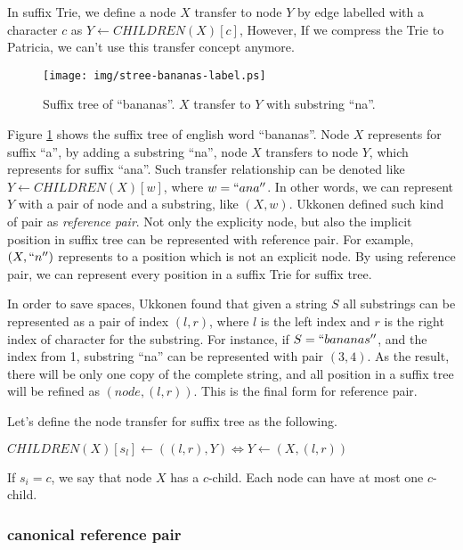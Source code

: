 \documentclass{article}
\begin{document}
In suffix Trie, we define a node $X$ transfer to node $Y$ by edge labelled with
a character $c$ as $Y \leftarrow CHILDREN(X)[c]$, However, If we compress the Trie
to Patricia, we can't use this transfer concept anymore.

\begin{figure}[htbp]
   \begin{center}
     \texttt{[image: img/stree-bananas-label.ps]}
     \caption{Suffix tree of ``bananas''. $X$ transfer to $Y$ with substring ``na''.}
     \label{fig:stree-bananas-label}
   \end{center}
\end{figure}

Figure \ref{fig:stree-bananas-label} shows the suffix tree of english word ``bananas''.
Node $X$ represents for suffix ``a'', by adding a substring ``na'', node $X$ transfers
to node $Y$, which represents for suffix ``ana''. Such transfer relationship can be
denoted like $Y \leftarrow CHILDREN(X)[w]$, where $w=``ana''$. In other words, we can
represent $Y$ with a pair of node and a substring, like $(X, w)$. Ukkonen defined
such kind of pair as {\em reference pair}. Not only the explicity node, but also the
implicit position in suffix tree can be represented with reference pair. For example,
$(X, ``n'')$ represents to a position which is not an explicit node. By using reference
pair, we can represent every position in a suffix Trie for suffix tree.

In order to save spaces, Ukkonen found that given a string $S$ all substrings can
be represented as a pair of index $(l, r)$, where $l$ is the left index and $r$ is the 
right index of character for the substring. For instance, if $S=``bananas''$, and the
index from 1, substring ``na'' can be represented with pair $(3, 4)$. As the result,
there will be only one copy of the complete string, and all position in a suffix tree
will be refined as $(node, (l, r))$. This is the final form for reference pair.

Let's define the node transfer for suffix tree as the following.

$CHILDREN(X)[s_l] \leftarrow ((l, r), Y) \iff Y \leftarrow (X, (l, r))$

If $s_i=c$, we say that node $X$ has a $c$-child. Each node can have at most one $c$-child.

\subsubsection{canonical reference pair}
\end{document}
